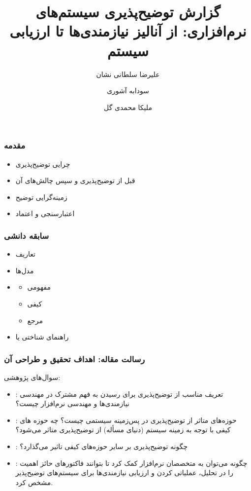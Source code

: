 \documentclass[10pt, a4paper]{beamer}
\title{گزارش توضیح‌پذیری سیستم‌های نرم‌افزاری: از آنالیز نیازمندی‌ها تا ارزیابی
سیستم}
\author{
    علیرضا سلطانی نشان
    \and 
    سودابه آشوری \\
    \and
    ملیکا محمدی گل \\
}
\institute{دانشگاه آزاد اسلامی واحد تهران شمال, خانم دکتر سپیده آدابی}
\begin{document}
\frame{\titlepage}
\begin{frame}
    \frametitle{مقدمه}

    \begin{itemize}
        \item چرایی توضیح‌پذیری
        \item قبل از توضیح‌پذیری و سپس چالش‌های آن
        \item زمینه‌گرایی توضیح
        \item اعتبارسنجی و اعتماد
    \end{itemize}
\end{frame}

\begin{frame}
    \frametitle{سابقه دانشی}
    \begin{itemize}
        \item تعاریف
        \item مدل‌ها
        \item \begin{itemize}
            \item مفهومی
            \item کیفی
            \item مرجع
        \end{itemize}
        \item راهنمای شناختی یا 
    \end{itemize}
\end{frame}

\begin{frame}
    \frametitle{رسالت مقاله: اهداف تحقیق و طراحی آن}
    سوال‌های پژوهشی:
    \begin{itemize}
        \item {}: تعریف مناسب از توضیح‌پذیری برای رسیدن به فهم مشترک در مهندسی
        نیازمندی‌ها و مهندسی نرم‌افزار چیست؟
        \item {}: حوزه‌های متاثر از توضیح‌پذیری در پس‌زمینه سیستمی چیست؟ چه
        حوزه های کیفی با توجه به زمینه سیستم (دنیای مسأله) از توضیح‌پذیری متاثر
        می‌شود؟
        \item {}: چگونه توضیح‌پذیری بر سایر حوزه‌های کیفی تاثیر می‌گذارد؟
        \item {}: چگونه می‌توان به متخصصان نرم‌افزار کمک کرد تا بتوانند
        فاکتورهای حائز اهمیت را در تحلیل، عملیاتی کردن و ارزیابی نیازمندی‌ها برای
        سیستم‌های توضیح‌پذیر مشخص کرد.
    \end{itemize}
\end{frame}
\end{document}
